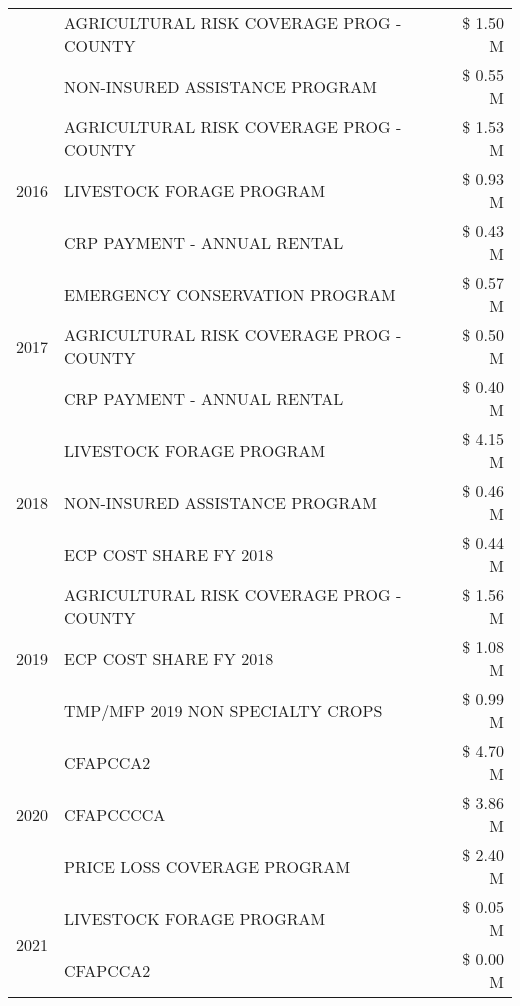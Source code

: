 \begin{tabular}{llr}
 & AGRICULTURAL RISK COVERAGE PROG - COUNTY & \$ 1.50 M \\
 & NON-INSURED ASSISTANCE PROGRAM & \$ 0.55 M \\
\cline{1-3}
\multirow[t]{3}{*}{2016} & AGRICULTURAL RISK COVERAGE PROG - COUNTY & \$ 1.53 M \\
 & LIVESTOCK FORAGE PROGRAM & \$ 0.93 M \\
 & CRP PAYMENT - ANNUAL RENTAL & \$ 0.43 M \\
\cline{1-3}
\multirow[t]{3}{*}{2017} & EMERGENCY CONSERVATION PROGRAM & \$ 0.57 M \\
 & AGRICULTURAL RISK COVERAGE PROG - COUNTY & \$ 0.50 M \\
 & CRP PAYMENT - ANNUAL RENTAL & \$ 0.40 M \\
\cline{1-3}
\multirow[t]{3}{*}{2018} & LIVESTOCK FORAGE PROGRAM & \$ 4.15 M \\
 & NON-INSURED ASSISTANCE PROGRAM & \$ 0.46 M \\
 & ECP COST SHARE FY 2018 & \$ 0.44 M \\
\cline{1-3}
\multirow[t]{3}{*}{2019} & AGRICULTURAL RISK COVERAGE PROG - COUNTY & \$ 1.56 M \\
 & ECP COST SHARE FY 2018 & \$ 1.08 M \\
 & TMP/MFP 2019 NON SPECIALTY CROPS & \$ 0.99 M \\
\cline{1-3}
\multirow[t]{3}{*}{2020} & CFAPCCA2 & \$ 4.70 M \\
 & CFAPCCCCA & \$ 3.86 M \\
 & PRICE LOSS COVERAGE PROGRAM & \$ 2.40 M \\
\cline{1-3}
\multirow[t]{2}{*}{2021} & LIVESTOCK FORAGE PROGRAM & \$ 0.05 M \\
 & CFAPCCA2 & \$ 0.00 M \\
\cline{1-3}
\bottomrule
\end{tabular}
